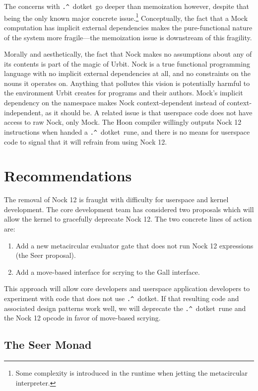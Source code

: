 \documentclass[twoside]{article}
\newcommand{\dotket}{\lstinline[style=inlinecode]{.^}~dotket}
\begin{document}
The concerns with \dotket~go deeper than memoization however, despite that being the only known major concrete issue.\footnote{Some complexity is introduced in the runtime when jetting the metacircular interpreter.}  Conceptually, the fact that a Mock computation has implicit external dependencies makes the pure-functional nature of the system more fragile—the memoization issue is downstream of this fragility.

Morally and aesthetically, the fact that Nock makes no assumptions about any of its contents is part of the magic of Urbit.  Nock is a true functional programming language with no implicit external dependencies at all, and no constraints on the nouns it operates on.  Anything that pollutes this vision is potentially harmful to the environment Urbit creates for programs and their authors.  Mock's implicit dependency on the namespace makes Nock context-dependent instead of context-independent, as it should be.  A related issue is that userspace code does not have access to raw Nock, only Mock.  The Hoon compiler willingly outputs Nock 12 instructions when handed a \dotket~rune, and there is no means for userspace code to signal that it will refrain from using Nock 12.


\section{Recommendations}

The removal of Nock 12 is fraught with difficulty for userspace and kernel development.  The core development team has considered two proposals which will allow the kernel to gracefully deprecate Nock 12.  The two concrete lines of action are:

\begin{enumerate}
  \item  Add a new metacircular evaluator gate that does not run Nock 12 expressions (the Seer proposal).
  \item  Add a move-based interface for scrying to the Gall interface.
\end{enumerate}

This approach will allow core developers and userspace application developers to experiment with code that does not use \dotket.  If that resulting code and associated design patterns work well, we will deprecate the \dotket~rune and the Nock 12 opcode in favor of move-based scrying.

\subsection{The Seer Monad}
\end{document}
